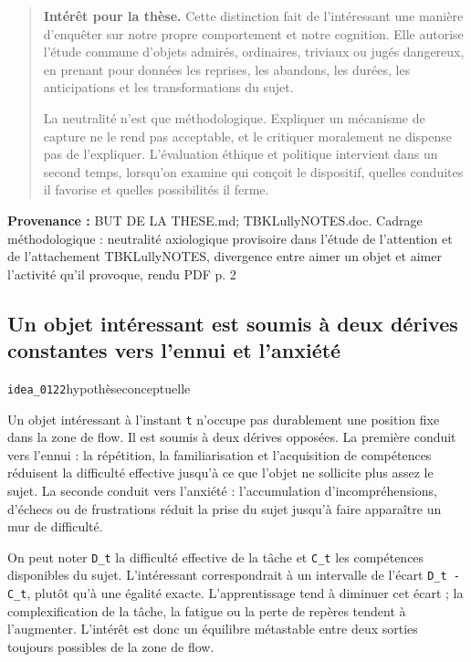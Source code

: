 \documentclass[10pt,a4paper]{article}
\begin{document}
\begin{quote}
\textbf{Intérêt pour la thèse.} Cette distinction fait de l'intéressant une manière d'enquêter sur notre propre comportement et notre cognition. Elle autorise l'étude commune d'objets admirés, ordinaires, triviaux ou jugés dangereux, en prenant pour données les reprises, les abandons, les durées, les anticipations et les transformations du sujet.

La neutralité n'est que méthodologique. Expliquer un mécanisme de capture ne le rend pas acceptable, et le critiquer moralement ne dispense pas de l'expliquer. L'évaluation éthique et politique intervient dans un second temps, lorsqu'on examine qui conçoit le dispositif, quelles conduites il favorise et quelles possibilités il ferme.
\end{quote}
{\footnotesize\color{metadata}\textbf{Provenance :} BUT DE LA THESE.md; TBKLullyNOTES.doc. Cadrage méthodologique : neutralité axiologique provisoire dans l'étude de l'attention et de l'attachement TBKLullyNOTES, divergence entre aimer un objet et aimer l'activité qu'il provoque, rendu PDF p. 2\par}

\subsection{Un objet intéressant est soumis à deux dérives constantes vers l'ennui et l'anxiété}
{\small\color{metadata} \texttt{idea\_0122}\quad\textbullet\quad hypothèse\quad\textbullet\quad conceptuelle\par}

Un objet intéressant à l'instant \texttt{t} n'occupe pas durablement une position fixe dans la zone de flow. Il est soumis à deux dérives opposées. La première conduit vers l'ennui : la répétition, la familiarisation et l'acquisition de compétences réduisent la difficulté effective jusqu'à ce que l'objet ne sollicite plus assez le sujet. La seconde conduit vers l'anxiété : l'accumulation d'incompréhensions, d'échecs ou de frustrations réduit la prise du sujet jusqu'à faire apparaître un mur de difficulté.

On peut noter \texttt{D\_t} la difficulté effective de la tâche et \texttt{C\_t} les compétences disponibles du sujet. L'intéressant correspondrait à un intervalle de l'écart \texttt{D\_t - C\_t}, plutôt qu'à une égalité exacte. L'apprentissage tend à diminuer cet écart ; la complexification de la tâche, la fatigue ou la perte de repères tendent à l'augmenter. L'intérêt est donc un équilibre métastable entre deux sorties toujours possibles de la zone de flow.
\end{document}

